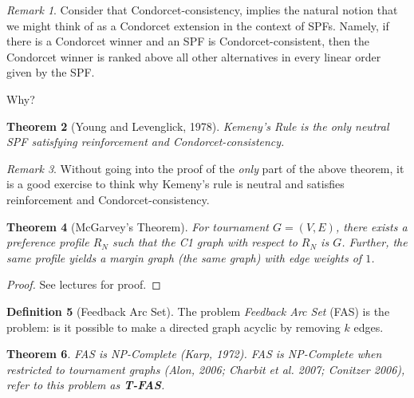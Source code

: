 \documentclass{book}
\newcommand{\unclear}[1]{%
  \par\noindent
  \colorbox{yellow!30}{#1}\par
}
\theoremstyle{plain}
\newtheorem{theorem}{Theorem}[subsection]
\theoremstyle{definition}
\newtheorem{definition}[theorem]{Definition}
\theoremstyle{remark}
\newtheorem{remark}[theorem]{Remark}
\newtheorem*{comment}{Comment}
\begin{document}
\begin{remark}
    Consider that Condorcet-consistency, implies the 
    natural notion that we might think of as a Condorcet extension in the 
    context of SPFs. Namely, 
    if there is a Condorcet winner and an SPF is 
    Condorcet-consistent, then the Condorcet winner is ranked above all other alternatives in every linear order given by the SPF.
    \unclear{Why?}
\end{remark}

\begin{theorem}[Young and Levenglick, 1978]
    Kemeny's Rule is the only 
    neutral SPF satisfying 
    reinforcement and Condorcet-consistency.
\end{theorem}

\begin{remark}
    Without going into the proof of the 
    \emph{only} part of the above theorem, 
    it is a good exercise to think why 
    Kemeny's rule is neutral and satisfies reinforcement and Condorcet-consistency.
\end{remark}

\begin{theorem}[McGarvey's Theorem]
    For tournament $G = (V, E)$, 
    there exists a preference profile 
    $R_N$ such that the C1 graph with respect to $R_N$ is $G$.
    Further, the same profile yields a margin graph (the same graph)
    with edge weights of $1$.
\end{theorem}
\begin{proof}
    \unclear{See lectures for proof.}
\end{proof}

\begin{definition}[Feedback Arc Set]
    The problem 
    \emph{Feedback Arc Set} (FAS)
    is the problem:
    is it possible to make a directed graph acyclic by 
    removing $k$ edges.
\end{definition}

\begin{theorem}
    FAS is NP-Complete (Karp, 1972).
    FAS is NP-Complete when 
    restricted to 
    tournament graphs (Alon, 2006; Charbit et al. 2007; Conitzer 2006), 
    refer to this problem as \textbf{T-FAS}.
\end{theorem}
\end{document}
